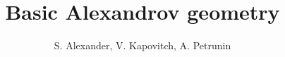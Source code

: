 \frontmatter
\title{Basic Alexandrov geometry}
\author{S. Alexander, V. Kapovitch, A. Petrunin}
\maketitle